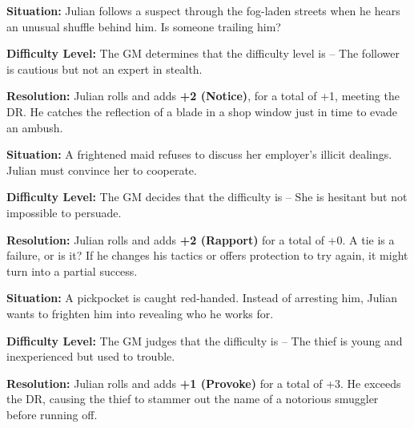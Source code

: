 \begin{Example}
	\textbf{Situation:} Julian follows a suspect through the fog-laden streets when he hears an unusual shuffle behind him. Is someone trailing him?

	\noindent\textbf{Difficulty Level:} The GM determines that the difficulty level is \Difficult – The follower is cautious but not an expert in stealth.

	\noindent\textbf{Resolution:} Julian rolls  and adds  \textbf{+2 (Notice)}, for a total of +1, meeting the DR. He catches the reflection of a blade in a shop window just in time to evade an ambush.
\end{Example}


\begin{Example}
	\textbf{Situation:} A frightened maid refuses to discuss her employer’s illicit dealings. Julian must convince her to cooperate.

	\noindent\textbf{Difficulty Level:} The GM decides that the difficulty is \Challenging – She is hesitant but not impossible to persuade.

	\noindent\textbf{Resolution:} Julian rolls \FudgeRes{+---} and adds \textbf{+2 (Rapport)} for a total of +0. A tie is a failure, or is it? If he changes his tactics or offers protection to try again, it might turn into a partial success.
\end{Example}


\begin{Example}
	\textbf{Situation:} A pickpocket is caught red-handed. Instead of arresting him, Julian wants to frighten him into revealing who he works for.

	\noindent\textbf{Difficulty Level:} The GM judges that the difficulty is \Basic – The thief is young and inexperienced but used to trouble.

	\noindent\textbf{Resolution:} Julian rolls  and adds \textbf{+1 (Provoke)} for a total of +3. He exceeds the DR, causing the thief to stammer out the name of a notorious smuggler before running off.
\end{Example}


